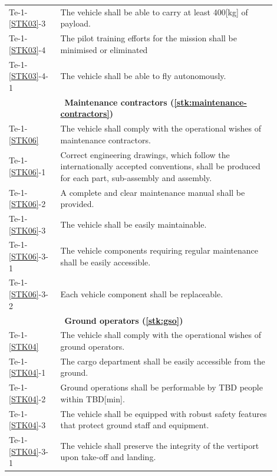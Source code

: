 \begin{longtable}{m{0.16\linewidth}m{0.74\linewidth}}
        \cellcolor[HTML]{9AFF99}Te-1-\ref{STK03}-3 & \cellcolor[HTML]{9AFF99}The vehicle shall be able to carry at least 400[kg] of payload.\\
        Te-1-\ref{STK03}-4 & The pilot training efforts for the mission shall be minimised or eliminated \\
            \cellcolor[HTML]{9AFF99}Te-1-\ref{STK03}-4-1 & \cellcolor[HTML]{9AFF99}The vehicle shall be able to fly autonomously. \\
        \hline &~\textbf{Maintenance contractors (\ref{stk:maintenance-contractors})} \\\hline
        Te-1-\ref{STK06} & The vehicle shall comply with the operational wishes of maintenance contractors. \\
        Te-1-\ref{STK06}-1 & Correct engineering drawings, which follow the internationally accepted conventions, shall be produced for each part, sub-assembly and assembly.\\
        Te-1-\ref{STK06}-2 & A complete and clear maintenance manual shall be provided. \\
        Te-1-\ref{STK06}-3 & The vehicle shall be easily maintainable.\\
        \cellcolor[HTML]{9AFF99}Te-1-\ref{STK06}-3-1 & \cellcolor[HTML]{9AFF99}The vehicle components requiring regular maintenance shall be easily accessible.\\
        Te-1-\ref{STK06}-3-2 & Each vehicle component shall be replaceable.\\
        \hline &~\textbf{Ground operators (\ref{stk:gso})} \\\hline
        Te-1-\ref{STK04} & The vehicle shall comply with the operational wishes of ground operators. \\
        Te-1-\ref{STK04}-1 & The cargo department shall be easily accessible from the ground.\\
        Te-1-\ref{STK04}-2 & Ground operations shall be performable by TBD people within TBD[min]. \\
        Te-1-\ref{STK04}-3 & The vehicle shall be equipped with robust safety features that protect ground staff and equipment.\\
        Te-1-\ref{STK04}-3-1 & The vehicle shall preserve the integrity of the vertiport upon take-off and landing.\\

\end{longtable}
